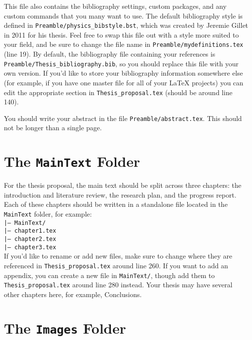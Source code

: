 This file also contains the bibliography settings, custom packages, and any custom
commands that you many want to use. The default bibliography style is defined in
\texttt{Preamble/physics\_bibstyle.bst}, which was created by Jeremie Gillet in 2011
for his thesis. Feel free to swap this file out with a style more suited to your
field, and be sure to change the file name in \texttt{Preamble/mydefinitions.tex}
(line 19). By default, the bibliography file containing
your references is \texttt{Preamble/Thesis\_bibliography.bib}, so you should
replace this file with your own version. If you'd like to store your bibliography
information somewhere else (for example, if you have one master file for all of your
LaTeX projects) you can edit the appropriate section in \texttt{Thesis\_proposal.tex}
(should be around line 140).

You should write your abstract in the file \texttt{Preamble/abstract.tex}. This
should not be longer than a single page.

\section{The \texttt{MainText} Folder}

For the thesis proposal, the main text should be split across three chapters:
the introduction and literature review, the research plan, and the progress report.
Each of these chapters should be written in a standalone file located in
the \texttt{MainText} folder, for example:
\texttt{
\\
|--- MainText/ \\ 
\hspace*{0.5cm}|--- chapter1.tex\\
\hspace*{0.5cm}|--- chapter2.tex\\
\hspace*{0.5cm}|--- chapter3.tex\\
}
If you'd like to rename or add new files, make sure to change where they are
referenced in \texttt{Thesis\_proposal.tex} around line 260. If you want
to add an appendix, you can create a new file in \texttt{MainText/}, though
add them to \texttt{Thesis\_proposal.tex} around line 280 instead.
Your thesis may have several other chapters here, for example, Conclusions.

\section{The \texttt{Images} Folder}

